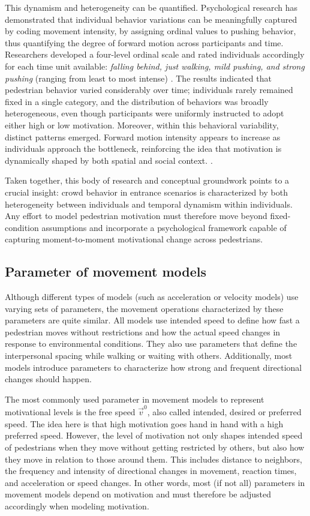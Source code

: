 \documentclass[pdflatex,sn-mathphys-num]{sn-jnl}%
\theoremstyle{thmstyleone}%
\theoremstyle{thmstyletwo}%
\theoremstyle{thmstylethree}%
\begin{document}
This dynamism and heterogeneity can be quantified. Psychological research has demonstrated that individual behavior variations can be meaningfully captured by coding movement intensity, by assigning ordinal values to pushing behavior, thus quantifying the degree of forward motion across participants and time. Researchers developed a four-level ordinal scale and rated individuals accordingly for each time unit available: \textit{falling behind, just walking, mild pushing, and strong pushing} (ranging from least to most intense) \cite{usten_pushing_2022}. The results indicated that pedestrian behavior varied considerably over time; individuals rarely remained fixed in a single category, and the distribution of behaviors was broadly heterogeneous, even though participants were uniformly instructed to adopt either high or low motivation. Moreover, within this behavioral variability, distinct patterns emerged. Forward motion intensity appears to increase as individuals approach the bottleneck, reinforcing the idea that motivation is dynamically shaped by both spatial and social context. \cite{usten_dynamic_2023}. 

Taken together, this body of research and conceptual groundwork points to a crucial insight: crowd behavior in entrance scenarios is characterized by both heterogeneity between individuals and temporal dynamism within individuals. Any effort to model pedestrian motivation must therefore move beyond fixed-condition assumptions and incorporate a psychological framework capable of capturing moment-to-moment motivational change across pedestrians.




\subsection{Parameter of movement models} 
Although different types of models (such as acceleration or velocity models) use varying sets of parameters, the movement operations characterized by these parameters are quite similar. All models use intended speed to define how fast a pedestrian moves without restrictions and how the actual speed changes in response to environmental conditions. They also use parameters that define the interpersonal spacing while walking or waiting with others. Additionally, most models introduce parameters to characterize how strong and frequent directional changes should happen.     

The most commonly used parameter in movement models to represent motivational levels is the free speed $\vec{v}^0$, also called intended, desired or preferred speed. The idea here is that high motivation goes hand in hand with a high preferred speed. However, the level of motivation not only shapes intended speed of pedestrians when they move without getting restricted by others, but also how they move in relation to those around them. This includes distance to neighbors, the frequency and intensity of directional changes in movement, reaction times, and acceleration or speed changes. In other words, most (if not all) parameters in movement models depend on motivation and must therefore be adjusted accordingly when modeling motivation.  
\end{document}
